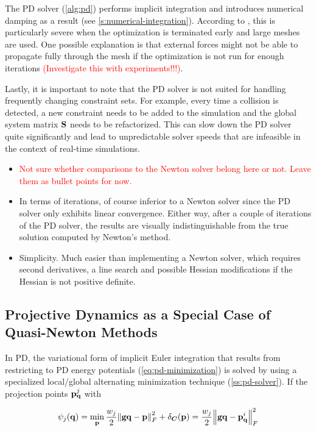 The PD solver (\cref{alg:pd}) performs implicit integration and introduces numerical damping as a result (see \cref{s:numerical-integration}).
According to \cite{bouaziz2014}, this is particularly severe when the optimization is terminated early and large meshes are used. One possible
explanation is that external forces might not be able to propagate fully through the mesh if the optimization is not run for enough iterations
\cite{bouaziz2014} \textcolor{red}{(Investigate this with experiments!!!)}.

Lastly, it is important to note that the PD solver is not suited for handling frequently changing constraint sets. For example, every time 
a collision is detected, a new constraint needs to be added to the simulation and the global system matrix $\mathbf{S}$ needs
to be refactorized. This can slow down the PD solver quite significantly and lead to unpredictable solver speeds that are infeasible in the
context of real-time simulations.

\begin{itemize}
    \item \textcolor{red}{Not sure whether comparisons to the Newton solver belong here or not. Leave them as bullet points for now.}
    \item In terms of iterations, of course inferior to a Newton solver since the PD solver only exhibits linear convergence. 
        Either way, after a couple of iterations of the PD solver, the results are visually 
        indistinguishable from the true solution computed by Newton's method.
    \item Simplicity. Much easier than implementing a Newton solver, which requires second derivatives, a line search and possible 
        Hessian modifications if the Hessian is not positive definite. 
\end{itemize}

\subsection{Projective Dynamics as a Special Case of Quasi-Newton Methods}\label{ss:pd-quasi-newton}
In PD, the variational form of implicit Euler integration that results from restricting to PD energy potentials (\cref{eq:pd-minimization}) 
is solved by using a specialized local/global alternating minimization technique (\cref{ss:pd-solver}). If the projection points 
$\mathbf{p}^j_{\mathbf{q}}$ with 

\[
    \psi_j({\mathbf{q}}) = \min_{\mathbf{p}} \frac{w_j}{2} \norm{\mathbf{gq} - \mathbf{p}}^2_F + \delta_{\bm{C}}(\mathbf{p})
    = \frac{w_j}{2} \norm{\mathbf{gq} - \mathbf{p}^i_\mathbf{q}}^2_F
\]

